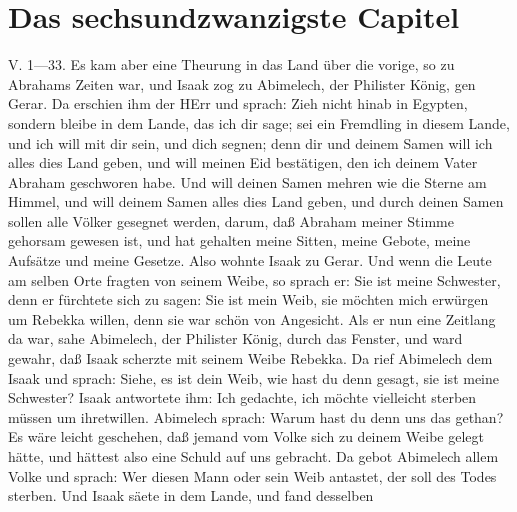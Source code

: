 \section{Das sechsundzwanzigste Capitel}

\begin{schriftzitat}
V. 1—33. Es kam aber eine Theurung in das Land über die vorige, so zu Abrahams Zeiten war, und Isaak zog zu Abimelech, der Philister König, gen Gerar. Da erschien ihm der HErr und sprach: Zieh nicht hinab in Egypten, sondern bleibe in dem Lande, das ich dir sage; sei ein Fremdling in diesem Lande, und ich will mit dir sein, und dich segnen; denn dir und deinem Samen will ich alles dies Land geben, und will meinen Eid bestätigen, den ich deinem Vater Abraham geschworen habe. Und will deinen Samen mehren wie die Sterne am Himmel, und will deinem Samen alles dies Land geben, und durch deinen Samen sollen alle Völker gesegnet werden, darum, daß Abraham meiner Stimme gehorsam gewesen ist, und hat gehalten meine Sitten, meine Gebote, meine Aufsätze und meine Gesetze. Also wohnte Isaak zu Gerar. Und wenn die Leute am selben Orte fragten von seinem Weibe, so sprach er: Sie ist meine Schwester, denn er fürchtete sich zu sagen: Sie ist mein Weib, sie möchten mich erwürgen um Rebekka willen, denn sie war schön von Angesicht. Als er nun eine Zeitlang da war, sahe Abimelech, der Philister König, durch das Fenster, und ward gewahr, daß Isaak scherzte mit seinem Weibe Rebekka. Da rief Abimelech dem Isaak und sprach: Siehe, es ist dein Weib, wie hast du denn gesagt, sie ist meine Schwester? Isaak antwortete ihm: Ich gedachte, ich möchte vielleicht sterben müssen um ihretwillen. Abimelech sprach: Warum hast du denn uns das gethan? Es wäre leicht geschehen, daß jemand vom Volke sich zu deinem Weibe gelegt hätte, und hättest also eine Schuld auf uns gebracht. Da gebot Abimelech allem Volke und sprach: Wer diesen Mann oder sein Weib antastet, der soll des Todes sterben. Und Isaak säete in dem Lande, und fand desselben

\end{schriftzitat}
